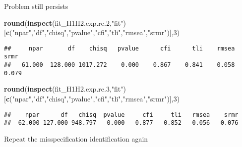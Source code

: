 \documentclass[
]{article}
\newenvironment{Shaded}{\begin{snugshade}}{\end{snugshade}}
\newcommand{\CommentTok}[1]{\textcolor[rgb]{0.56,0.35,0.01}{\textit{#1}}}
\newcommand{\DataTypeTok}[1]{\textcolor[rgb]{0.13,0.29,0.53}{#1}}
\newcommand{\DecValTok}[1]{\textcolor[rgb]{0.00,0.00,0.81}{#1}}
\newcommand{\FloatTok}[1]{\textcolor[rgb]{0.00,0.00,0.81}{#1}}
\newcommand{\KeywordTok}[1]{\textcolor[rgb]{0.13,0.29,0.53}{\textbf{#1}}}
\newcommand{\NormalTok}[1]{#1}
\newcommand{\OperatorTok}[1]{\textcolor[rgb]{0.81,0.36,0.00}{\textbf{#1}}}
\newcommand{\StringTok}[1]{\textcolor[rgb]{0.31,0.60,0.02}{#1}}
\begin{document}
Problem still persists

\begin{Shaded}
\begin{Highlighting}[]
\KeywordTok{round}\NormalTok{(}\KeywordTok{inspect}\NormalTok{(fit_H1H2.exp.re}\FloatTok{.2}\NormalTok{,}\StringTok{"fit"}\NormalTok{)}
\NormalTok{      [}\KeywordTok{c}\NormalTok{(}\StringTok{"npar"}\NormalTok{,}\StringTok{"df"}\NormalTok{,}\StringTok{"chisq"}\NormalTok{,}\StringTok{"pvalue"}\NormalTok{,}\StringTok{"cfi"}\NormalTok{,}\StringTok{"tli"}\NormalTok{,}\StringTok{"rmsea"}\NormalTok{,}\StringTok{"srmr"}\NormalTok{)],}\DecValTok{3}\NormalTok{)}
\end{Highlighting}
\end{Shaded}

\begin{verbatim}
##     npar       df    chisq   pvalue      cfi      tli    rmsea     srmr 
##   61.000  128.000 1017.272    0.000    0.867    0.841    0.058    0.079
\end{verbatim}

\begin{Shaded}
\begin{Highlighting}[]
\KeywordTok{round}\NormalTok{(}\KeywordTok{inspect}\NormalTok{(fit_H1H2.exp.re}\FloatTok{.3}\NormalTok{,}\StringTok{"fit"}\NormalTok{)}
\NormalTok{      [}\KeywordTok{c}\NormalTok{(}\StringTok{"npar"}\NormalTok{,}\StringTok{"df"}\NormalTok{,}\StringTok{"chisq"}\NormalTok{,}\StringTok{"pvalue"}\NormalTok{,}\StringTok{"cfi"}\NormalTok{,}\StringTok{"tli"}\NormalTok{,}\StringTok{"rmsea"}\NormalTok{,}\StringTok{"srmr"}\NormalTok{)],}\DecValTok{3}\NormalTok{)}
\end{Highlighting}
\end{Shaded}

\begin{verbatim}
##    npar      df   chisq  pvalue     cfi     tli   rmsea    srmr 
##  62.000 127.000 948.797   0.000   0.877   0.852   0.056   0.076
\end{verbatim}

Repeat the misspecification identification again

\begin{Shaded}
\end{Shaded}
\end{document}

